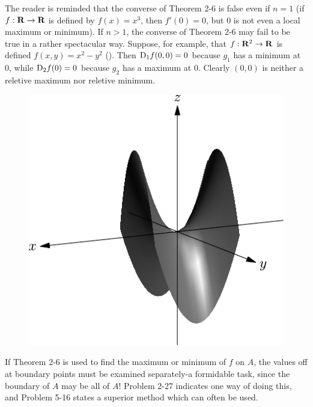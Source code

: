 The reader is reminded that the converse of Theorem 2-6
is false even if $n=1$ (if $f:\mathbf{R}\to \mathbf{R}$ is defined by $f(x) = x^3$, then $f'(0) = 0$, but 
0 is not even a local maximum or minimum). If $n>1$, the converse of Theorem 2-6 may fail 
to be true in a rather spectacular way. Suppose, for example, that $f:\mathbf{R}^2\to \mathbf{R}$ is defined 
$f(x, y) = x^2-y^2$ (). Then $\mathrm{D}_1f(0, 0) = 0$ because $g_1$ 
has a minimum at 0, while $\mathrm{D}_2f(0) = 0$ because $g_2$ has a maximum at 0. 
Clearly $(0, 0)$ is neither a reletive maximum nor reletive minimum.

\begin{figure}[!htb]
    \centering
    \includegraphics[width=.75\linewidth]{./pics/Fig2-2.pdf}
    \caption{}
    \label{Fig 2-2}
\end{figure}

If Theorem 2-6 is used to find the maximum or minimum of
$f$ on $A$, the values off at boundary points must be examined
separately-a formidable task, since the boundary of $A$ may
be all of $A$! Problem 2-27 indicates one way of doing this,
and Problem 5-16 states a superior method which can often
be used.

